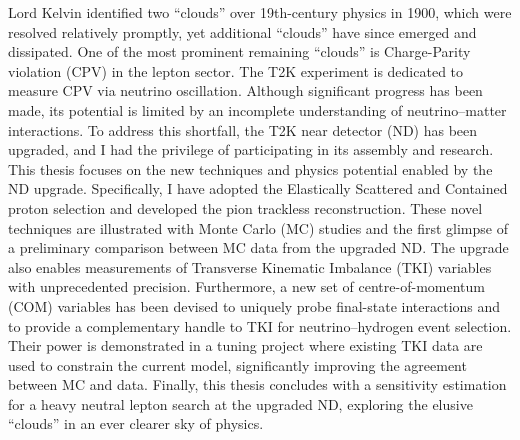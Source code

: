 Lord Kelvin identified two “clouds” over 19th-century physics in 1900, which were resolved relatively promptly, yet additional “clouds” have since emerged and dissipated.
One of the most prominent remaining ``clouds'' is Charge-Parity violation (CPV) in the lepton sector.
The T2K experiment is dedicated to measure CPV via neutrino oscillation.
Although significant progress has been made, its potential is limited by an incomplete understanding of neutrino–matter interactions.
To address this shortfall, the T2K near detector (ND) has been upgraded, and I had the privilege of participating in its assembly and research.
This thesis focuses on the new techniques and physics potential enabled by the ND upgrade.
Specifically, I have adopted the Elastically Scattered and Contained proton selection and developed the pion trackless reconstruction.
These novel techniques are illustrated with Monte Carlo (MC) studies and the first glimpse of a preliminary comparison between MC data from the upgraded ND.
The upgrade also enables measurements of Transverse Kinematic Imbalance (TKI) variables with unprecedented precision. 
Furthermore, a new set of centre-of-momentum (COM) variables has been devised to uniquely probe final-state interactions and to provide a complementary handle to TKI for neutrino–hydrogen event selection.
Their power is demonstrated in a tuning project where existing TKI data are used to constrain the current model, significantly improving the agreement between MC and data.
Finally, this thesis concludes with a sensitivity estimation for a heavy neutral lepton search at the upgraded ND, exploring the elusive “clouds” in an ever clearer sky of physics.